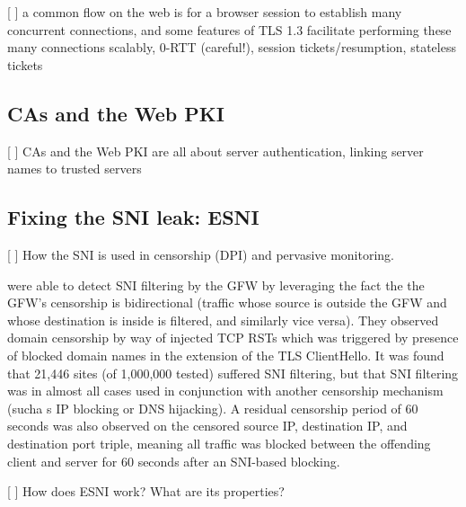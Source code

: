 [ ] a common flow on the web is for a browser session to establish many concurrent connections, and some features of TLS 1.3 facilitate performing these many connections scalably, 0-RTT (careful!), session tickets/resumption, stateless tickets
\subsection{CAs and the Web PKI}

[ ] CAs and the Web PKI are all about server authentication, linking server names to trusted servers
\subsection{Fixing the SNI leak: ESNI}

[ ] How the SNI is used in censorship (DPI) and pervasive monitoring.

\cite{chai2019importance} were able to detect SNI filtering by the GFW by leveraging the fact the the GFW's censorship is bidirectional (traffic whose source is outside the GFW and whose destination is inside is filtered, and similarly vice versa). They observed domain censorship by way of injected TCP RSTs which was triggered by presence of blocked domain names in the  extension of the TLS ClientHello. It was found that 21,446 sites (of 1,000,000 tested) suffered SNI filtering, but that SNI filtering was in almost all cases used in conjunction with another censorship mechanism (sucha s IP blocking or DNS hijacking). A residual censorship period of 60 seconds was also observed on the censored source IP, destination IP, and destination port triple, meaning all traffic was blocked between the offending client and server for 60 seconds after an SNI-based blocking.

[ ] How does ESNI work? What are its properties?

